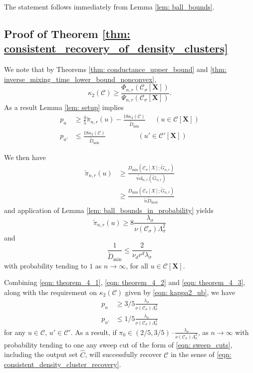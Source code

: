 \documentclass{article}
\newcommand{\vol}{\mathrm{vol}}
\newcommand{\1}{\mathbf{1}}
\newcommand{\Xbf}{\mathbf{X}}
\newcommand{\Cset}{\mathcal{C}}
\newcommand{\Csig}{\Cset_{\sigma}}
\newcommand{\wn}{\widetilde{n}}
\theoremstyle{aldenthm}
\begin{document}
The statement follows immediately from Lemma \ref{lem: ball_bounds}.

\subsection{Proof of Theorem \ref{thm: consistent_recovery_of_density_clusters}}

We note that by Theorems \ref{thm: conductance_upper_bound} and \ref{thm: inverse_mixing_time_lower_bound_nonconvex}, 
\begin{equation*}
\kappa_2(\Cset) \geq \frac{\Phi_{n,r}(\Csig[\Xbf])}{\Psi_{n,r}(\Csig[\Xbf])}.
\end{equation*}
As a result Lemma \ref{lem: setup} implies
\begin{align}
\label{eqn: theorem_4_1}
p_u & \geq \frac{4}{5} \widetilde{\pi}_{n,r}(u) - \frac{18 \kappa_2(\Cset)}{\widetilde{D}_{\min}} ~~~~~~ (u \in \Cset[\Xbf]) \nonumber \\
p_{u'} & \leq \frac{18 \kappa_2(\Cset)}{\widetilde{D}_{\min}} ~~~~~~~~~~~~~~~~~~~~~ (u' \in \Cset'[\Xbf])
\end{align}

We then have
\begin{align*}
\widetilde{\pi}_{n,r}(u) & \geq \frac{D_{\min}(\Csig[X]; \widetilde{G}_{n,r})}{\widetilde{\vol}_{n,r}(\widetilde{G}_{n,r})} \\
& \geq \frac{D_{\min}(\Csig[X]; \widetilde{G}_{n,r})}{\wn \widetilde{D}_{\max}}
\end{align*}
and application of Lemma \ref{lem: ball_bounds_in_probability} yields
\begin{equation}
\label{eqn: theorem_4_2}
\widetilde{\pi}_{n,r}(u) \geq 8 \frac{\lambda_{\sigma}}{\nu(\Csig) \Lambda_{\sigma}^2}
\end{equation}
and
\begin{equation}
\label{eqn: theorem_4_3}
\frac{1}{\widetilde{D}_{\min}} \leq \frac{2}{\nu_d r^d \lambda_{\sigma}}
\end{equation}
with probability tending to $1$ as $n \to \infty$, for all $u \in \Cset[\Xbf]$.

Combining \eqref{eqn: theorem_4_1}, \eqref{eqn: theorem_4_2} and \eqref{eqn: theorem_4_3}, along with the requirement on $\kappa_2(\Cset)$ given by \eqref{eqn: kappa2_ub}, we have
\begin{align*}
p_u & \geq 3/5 \frac{\lambda_{\sigma}}{\nu(\Csig) \Lambda_{\sigma}^2} \\
p_{u'} & \leq 1/5 \frac{\lambda_{\sigma}}{\nu(\Csig) \Lambda_{\sigma}^2}
\end{align*}
for any $u \in \Cset$, $u' \in \Cset'$. As a result, if $\pi_0 \in (2/5, 3/5)\cdot \frac{\lambda_{\sigma}}{\nu(\Csig) \Lambda_{\sigma}^2}$, as $n \to \infty$ with probability tending to one any sweep cut of the form of \eqref{eqn: sweep_cuts}, including the output set $\widehat{C}$, will successfully recover $\Cset$ in the sense of \eqref{eqn: consistent_density_cluster_recovery}.




	
\end{document}
